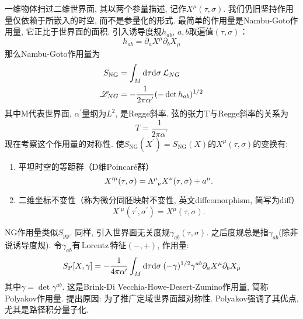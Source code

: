 一维物体扫过二维世界面, 其以两个参量描述, 记作$X^\mu(\tau,\sigma)$. 我们仍旧坚持作用量仅依赖于所嵌入的时空, 而不是参量化的形式. 最简单的作用量是Nambu-Goto作用量, 它正比于世界面的面积. 引入诱导度规$h_{ab}$, $a,b$取遍值$(\tau,\sigma)$：
\begin{equation}
h_{ab}=\partial_a X^\mu\partial_b X_\mu
\end{equation}
那么Nambu-Goto作用量为
\begin{subequations}
\begin{align}
S_{\mathrm{NG}}&=\int_M \mathrm{d}\tau \mathrm{d}\sigma\: \mathcal{L}_{NG} \\
\mathscr{L}_{NG}&=-\frac{1}{2\pi\alpha^\prime}(-\det h_{ab})^{1/2}
\end{align} \label{1.2.9} 
\end{subequations}
其中M代表世界面, $\alpha^\prime$量纲为$L^2$, 是Regge斜率. 弦的张力T与Regge斜率的关系为
\begin{equation}
T=\frac{1}{2\pi\alpha^\prime}
\end{equation}
现在考察这个作用量的对称性. 使$S_{\mathrm{NG}}(X^\prime)=S_{\mathrm{NG}}(X)$的$X^\mu(\tau,\sigma)$的变换有:
\begin{enumerate}
    \item 平坦时空的等距群（D维Poincar\'{e}群）
    \begin{equation}
    X^{\prime \mu}(\tau,\sigma)=\Lambda\indices{^\mu_\nu} X^\nu(\tau,\sigma)+a^\mu.
    \end{equation}
    \item 二维坐标不变性（称为微分同胚映射不变性, 英文diffeomorphism, 简写为diff）
    \begin{equation}
    X^{\prime \mu}(\tau^\prime,\sigma^\prime)=X^{\mu}(\tau,\sigma). \label{diffeomorphism}
    \end{equation}
\end{enumerate}

NG作用量类似$S_{\mathrm{pp}}$. 同样, 引入世界面无关度规$\gamma_{ab}(\tau,\sigma)$. 之后度规总是指$\gamma_{ab}$(除非说诱导度规). 
令$\gamma_{ab}$有\,Lorentz\,特征$(-,+)$, 作用量:
\begin{equation}
S_{\mathrm{P}}[X,\gamma]=-\frac{1}{4\pi\alpha^\prime}\int_M \mathrm{d}\tau\mathrm{d}\sigma\: (-\gamma)^{1/2}\gamma^{ab}\partial_a X^\mu\partial_b X_\mu 
\label{1.2.13}
\end{equation}
其中$\gamma=\det\gamma^{ab}$. 这是Brink-Di Vecchia-Howe-Desert-Zumino作用量, 简称Polyakov作用量. 提出原因: 为了推广定域世界面超对称性. Polyakov强调了其优点, 尤其是路径积分量子化. 


